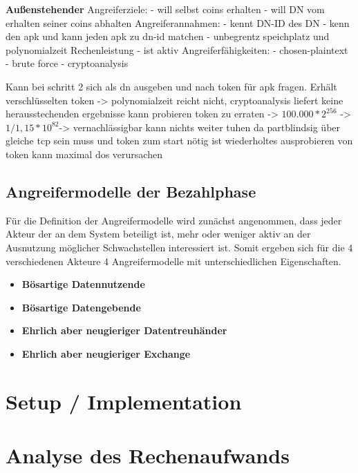 \documentclass{scrreprt}
\begin{document}
\textbf{Außenstehender}
Angreiferziele:
    - will selbst coins erhalten
    - will DN vom erhalten seiner coins abhalten
Angreiferannahmen:
    - kennt DN-ID des DN
    - kenn den apk und kann jeden apk zu dn-id matchen
    - unbegrentz speichplatz und polynomialzeit Rechenleistung
    - ist aktiv
Angreiferfähigkeiten:
    - chosen-plaintext
    - brute force
    - cryptoanalysis

Kann bei schritt 2 sich als dn ausgeben und nach token für apk fragen.
Erhält verschlüsselten token -> polynomialzeit reicht nicht, cryptoanalysis liefert keine herausstechenden ergebnisse
kann probieren token zu erraten -> $100.000 * 2^256$ -> $1/1,15*10^82 $-> vernachlässigbar
kann nichts weiter tuhen da partblindsig über gleiche tcp sein muss und token zum start nötig ist
wiederholtes ausprobieren von token kann maximal dos verursachen


\subsection{Angreifermodelle der Bezahlphase}
Für die Definition der Angreifermodelle wird zunächst angenommen, dass jeder Akteur der an dem System beteiligt ist, mehr oder weniger aktiv an der Ausnutzung möglicher Schwachstellen interessiert ist. Somit ergeben sich für die 4 verschiedenen Akteure 4 Angreifermodelle mit unterschiedlichen Eigenschaften.
\begin{itemize}
    \item \textbf{Bösartige Datennutzende}
    \item \textbf{Bösartige Datengebende}
    \item \textbf{Ehrlich aber neugieriger Datentreuhänder}
    \item \textbf{Ehrlich aber neugieriger Exchange}
\end{itemize}


\section{Setup / Implementation}

\section{Analyse des Rechenaufwands}
\end{document}
